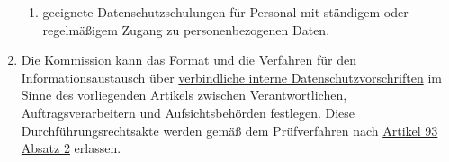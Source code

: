 \begin{enumerate}
\begin{enumerate}
    \item geeignete Datenschutzschulungen für Personal mit ständigem oder regelmäßigem Zugang zu personenbezogenen
     Daten.
    \label{itm:47-2n}

  \end{enumerate}

  \item Die Kommission kann das Format und die Verfahren für den Informationsaustausch über \hyperref[itm:04-20]{verbindliche interne
   Datenschutzvorschriften} im Sinne des vorliegenden Artikels zwischen Verantwortlichen, Auftragsverarbeitern und
   Aufsichtsbehörden festlegen. Diese Durchführungsrechtsakte werden gemäß dem Prüfverfahren nach \hyperref[itm:93-2]
   {Artikel 93 Absatz 2} erlassen.
  \label{itm:47-3}

\end{enumerate}


